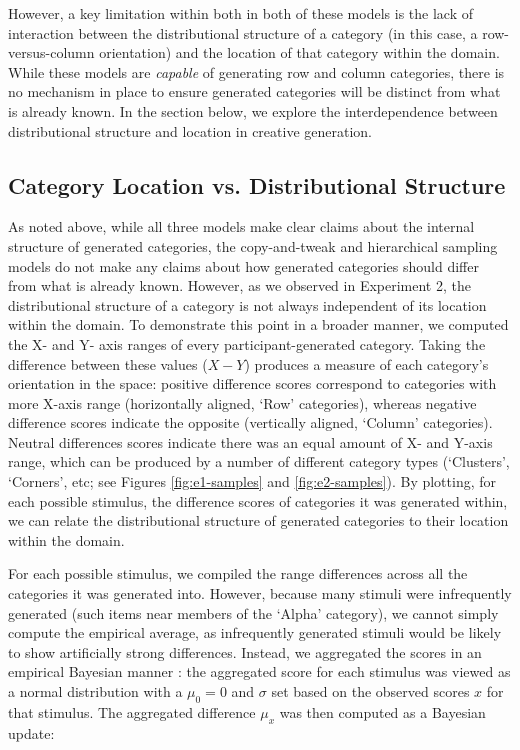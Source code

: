 \documentclass[12pt]{article}
\begin{document}
\begin{flushleft}
However, a key limitation within both in both of these models is the lack of interaction between the distributional structure of a category (in this case, a row-versus-column orientation) and the location of that category within the domain. While these models are {\em capable} of generating row and column categories, there is no mechanism in place to ensure generated categories will be distinct from what is already known. In the section below, we explore the interdependence between distributional structure and location in creative generation.

\subsection{Category Location vs. Distributional Structure}

As noted above, while all three models make clear claims about the internal structure of generated categories, the copy-and-tweak and hierarchical sampling models do not make any claims about how generated categories should differ from what is already known. However, as we observed in Experiment 2, the distributional structure of a category is not always independent of its location within the domain. To demonstrate this point in a broader manner, we computed the X- and Y- axis ranges of every participant-generated category. Taking the difference between these values ($X-Y$) produces a measure of each category's orientation in the space: positive difference scores correspond to categories with more X-axis range (horizontally aligned, `Row' categories), whereas negative difference scores indicate the opposite (vertically aligned, `Column' categories). Neutral differences scores indicate there was an equal amount of X- and Y-axis range, which can be produced by a number of different category types (`Clusters', `Corners', etc; see Figures \ref{fig:e1-samples} and \ref{fig:e2-samples}). By plotting, for each possible stimulus, the difference scores of categories it was generated within, we can relate the distributional structure of generated categories to their location within the domain.

For each possible stimulus, we compiled the range differences across all the categories it was generated into. However, because many stimuli were infrequently generated (such items near members of the `Alpha' category), we cannot simply compute the empirical average, as infrequently generated stimuli would be likely to show artificially strong differences. Instead, we aggregated the scores in an empirical Bayesian manner \citep{robbins1964empirical}: the aggregated score for each stimulus was viewed as a normal distribution with a $\mu_0 = 0$ and $\sigma$ set based on the observed scores $x$ for that stimulus. The aggregated difference $\mu_x$ was then computed as a Bayesian update: 



\end{flushleft}
\end{document}
